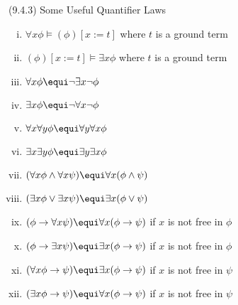 \begin{frame}{(9.4.3) Some Useful Quantifier Laws}

	\bigskip		
	
		\begin{enumerate}[(i)]
		\itemsep=6pt
		
		\item $\forall x\phi\vDash(\phi)[x:=t]$  where $t$ is a ground term

		\item $(\phi)[x:=t]\vDash\exists x\phi$ where $t$ is a ground term

		\item $\forall x\phi\equi \neg \exists x\neg\phi$
	
			\item $\exists x\phi\equi \neg \forall x\neg \phi$
		
			\item $\forall x\forall y\phi\equi \forall y\forall x\phi$

	\item $\exists x\exists y\phi\equi \exists y\exists x\phi$

	\item $(\forall x\phi\land \forall x\psi)\equi \forall x(\phi\land \psi)$

	\item $(\exists x\phi\lor \exists x\psi)\equi \exists x(\phi\lor \psi)$

	\item $(\phi\to \forall x\psi)\equi \forall x(\phi\to \psi)$ if $x$ is not free in $\phi$

	\item $(\phi\to \exists x\psi)\equi \exists x(\phi\to \psi)$ if $x$ is not free in $\phi$

	\item $(\forall x\phi\to \psi)\equi \exists x(\phi\to \psi)$ if $x$ is not free in $\psi$

	\item $(\exists x\phi\to \psi)\equi \forall x(\phi\to \psi)$ if $x$ is not free in $\psi$

		\end{enumerate}

\end{frame}

